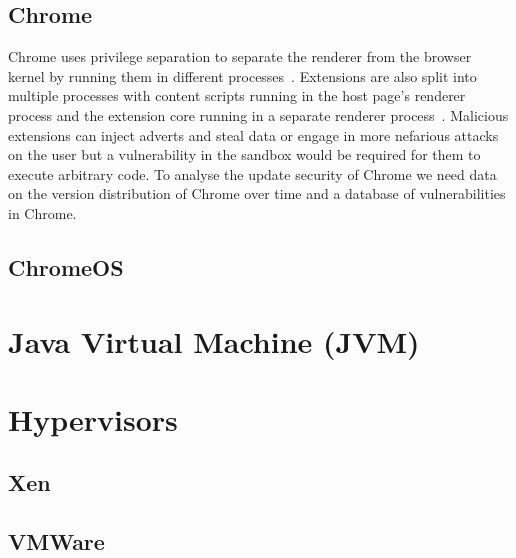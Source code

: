\documentclass[12pt,a4paper]{article}
\begin{document}
\subsection{Chrome}
Chrome uses privilege separation to separate the renderer from the browser kernel by running them in different processes~\cite{Barth2008}.
Extensions are also split into multiple processes with content scripts running in the host page's renderer process and the extension core running in a separate renderer process~\cite{Liu2012}.
Malicious extensions can inject adverts and steal data or engage in more nefarious attacks on the user but a vulnerability in the sandbox would be required for them to execute arbitrary code.
To analyse the update security of Chrome we need data on the version distribution of Chrome over time and a database of vulnerabilities in Chrome.

\subsection{ChromeOS}


\section{Java Virtual Machine (JVM)}

\section{Hypervisors}
\subsection{Xen}
\subsection{VMWare}

\printbibliography
\end{document}
